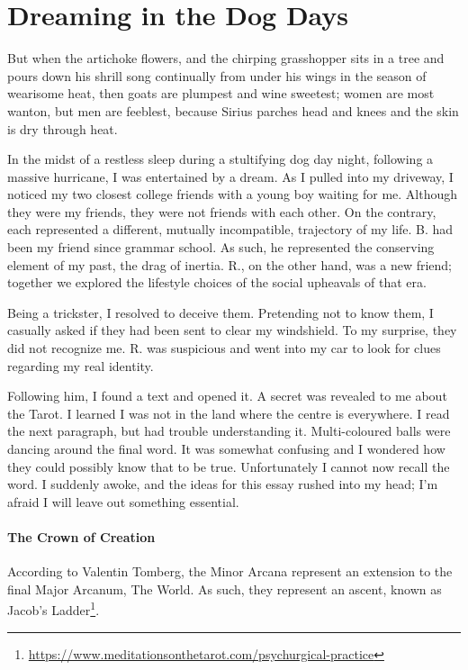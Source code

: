 \section{Dreaming in the Dog Days}

\begin{quotex}
But when the artichoke flowers, and the chirping grasshopper sits in a tree and pours down his shrill song continually from under his wings in the season of wearisome heat, then goats are plumpest and wine sweetest; women are most wanton, but men are feeblest, because Sirius parches head and knees and the skin is dry through heat.
\end{quotex}


In the midst of a restless sleep during a stultifying dog day night, following a massive hurricane, I was entertained by a dream. As I pulled into my driveway, I noticed my two closest college friends with a young boy waiting for me. Although they were my friends, they were not friends with each other. On the contrary, each represented a different, mutually incompatible, trajectory of my life. B. had been my friend since grammar school. As such, he represented the conserving element of my past, the drag of inertia. R., on the other hand, was a new friend; together we explored the lifestyle choices of the social upheavals of that era.

Being a trickster, I resolved to deceive them. Pretending not to know them, I casually asked if they had been sent to clear my windshield. To my surprise, they did not recognize me. R. was suspicious and went into my car to look for clues regarding my real identity.

Following him, I found a text and opened it. A secret was revealed to me about the Tarot. I learned I was not in the land where the centre is everywhere. I read the next paragraph, but had trouble understanding it. Multi-coloured balls were dancing around the final word. It was somewhat confusing and I wondered how they could possibly know that to be true. Unfortunately I cannot now recall the word. I suddenly awoke, and the ideas for this essay rushed into my head; I'm afraid I will leave out something essential.

\paragraph{The Crown of Creation}

According to Valentin Tomberg, the Minor Arcana represent an extension to the final Major Arcanum, The World. As such, they represent an ascent, known as Jacob's Ladder\footnote{\url{https://www.meditationsonthetarot.com/psychurgical-practice}}.

